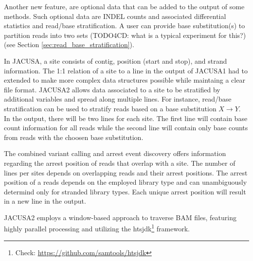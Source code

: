 \documentclass[10pt,a4paper,final]{article}
\begin{document}
Another new feature, are optional data that can be added to the output of some methods.
Such optional data are INDEL counts and associated differential statistics and read/base stratification. 
A user can provide base substitution(s) to partition reads into two sets (TODO4CD: what is a typical experiment for this?) 
(see Section \ref{sec:read_base_stratification}). 

In JACUSA, a site consists of contig, position (start and stop), and strand information.
The 1:1 relation of a site to a line in the output of JACUSA1 had to extended to make more complex data 
structures possible while maintaing a clear file format. JACUSA2 allows data associated to 
a site to be stratified by additional variables and spread along multiple lines.  For instance, 
read/base stratification can be used to stratify reads based on a base substitution $X \rightarrow Y$. 
In the output, there will be two lines for each site. The first line will contain base count information 
for all reads while the second line will contain only base counts from reads with the choosen base substitution. 

The combined variant calling and arrest event discovery \lrtarrest offers information regarding the 
arrest position of reads that overlap with a site. The number of lines per sites depends on overlapping 
reads and their arrest positions. The arrest position of a reads depends on the employed library type and 
can unambiguously determind only for stranded library types. Each unique arrest position will result in a
new line in the output. 

JACUSA2 employs a window-based approach to traverse BAM \cite{HengLi2009} files, featuring highly
parallel processing and utilizing the htsjdk\footnote{Check: \url{https://github.com/samtools/htsjdk}} 
framework.
\end{document}
